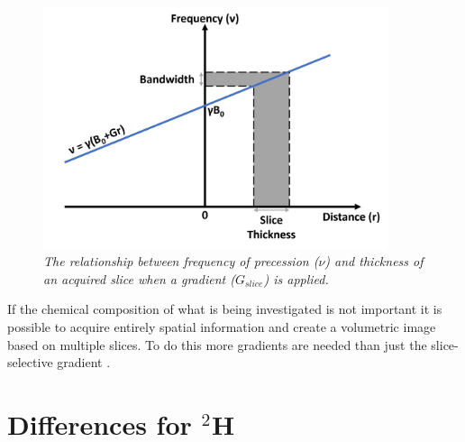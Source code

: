 \begin{figure}
    \centering
    \includegraphics[width=0.9\textwidth]{Figures/Theory/Gradient.png}
    \caption{\textit{The relationship between frequency of precession ($\nu$) and thickness of an acquired slice when a gradient ($G_{slice}$) is applied.}}
    \label{fig:theory:Grad}
\end{figure}

If the chemical composition of what is being investigated is not important it is possible to acquire entirely spatial information and create a volumetric image based on multiple slices. To do this more gradients are needed than just the slice-selective gradient \cite{deGraaf2019InSpectroscopy}.

\section{Differences for $^2$H}

